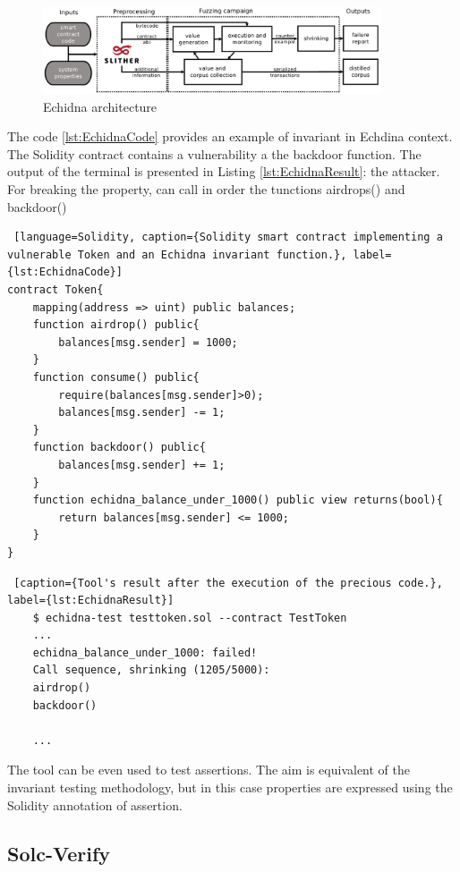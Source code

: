 \begin{figure}
    \centering
    \includegraphics[width=10cm]{logos/echidna.png}
    \caption{Echidna architecture}
    \label{fig:echdina_architecture}
\end{figure}

The code \autoref{lst:EchidnaCode} provides an example of invariant in Echdina context. The Solidity contract contains a vulnerability a the backdoor function. The output of the terminal is presented in Listing \autoref{lst:EchidnaResult}: the attacker. For breaking the property, can call in order the tunctions airdrops() and backdoor()

\begin{lstlisting} [language=Solidity, caption={Solidity smart contract implementing a vulnerable Token and an Echidna invariant function.}, label={lst:EchidnaCode}]
contract Token{
    mapping(address => uint) public balances;
    function airdrop() public{
        balances[msg.sender] = 1000;
    }
    function consume() public{
        require(balances[msg.sender]>0);
        balances[msg.sender] -= 1;
    }
    function backdoor() public{
        balances[msg.sender] += 1;
    }
    function echidna_balance_under_1000() public view returns(bool){
        return balances[msg.sender] <= 1000;
    }
}
\end{lstlisting}
\begin{lstlisting} [caption={Tool's result after the execution of the precious code.}, label={lst:EchidnaResult}]
    $ echidna-test testtoken.sol --contract TestToken
    ...
    echidna_balance_under_1000: failed!
    Call sequence, shrinking (1205/5000):
    airdrop()
    backdoor()

    ...
\end{lstlisting}

The tool can be even used to test assertions. 
The aim is equivalent of the invariant testing methodology, 
but in this case properties are expressed using the Solidity annotation of assertion.

\subsection{Solc-Verify}
\label{sec:Specification:Solc-Verify}

